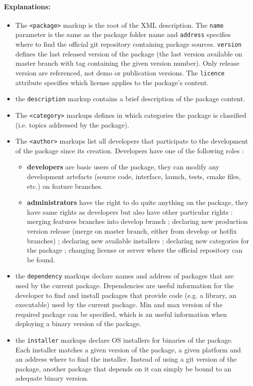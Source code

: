 \documentclass[12pt,a4paper]{article}
\begin{document}
\paragraph{Explanations:}
\begin{itemize}
\item The \texttt{<package>} markup is the root of the XML description. The \texttt{name} parameter is the same as the package folder name and \texttt{address} specifies where to find the official git repository containing package sources. \texttt{version} defines the last released version of the package (the last version available on master branch with tag containing the given version number). Only release version are referenced, not demo or publication versions. The \texttt{licence} attribute specifies which license applies to the package's content.
\item the \texttt{description} markup contains a brief description of the package content.
\item The \texttt{<category>} markups defines in which categories the package is classified (i.e. topics addressed by the package).
\item The \texttt{<author>} markups list all developers that participate to the development of the package since its creation. Developers have one of the following roles :
\begin{itemize}
\item \textbf{developers} are basic users of the package, they can modify any development artefacts (source code, interface, launch, tests, cmake files, etc.) on feature branches.
\item \textbf{administrators} have the right to do quite anything on the package, they have same rights as developers but also have other particular rights : merging features branches into develop branch ; declaring new production version release (merge on master branch, either from develop or hotfix branches) ; declaring new available installers ; declaring new categories for the package ; changing license or server where the official repository can be found.
\end{itemize}
\item the \texttt{dependency} markups declare names and address of packages that are used by the current package. Dependencies are useful information for the developer to find and install packages that provide code (e.g. a library, an executable) used by the current package. Min and max version of the required package can be specified, which is an useful information when deploying a binary version of the package.
\item the \texttt{installer} markups declare OS installers for binaries of the package. Each installer matches a given version of the package, a given platform and an address where to find the installer. Instead of using a git version of the package, another package that depends on it can simply be bound to an adequate binary version.
\end{itemize}
\end{document}
